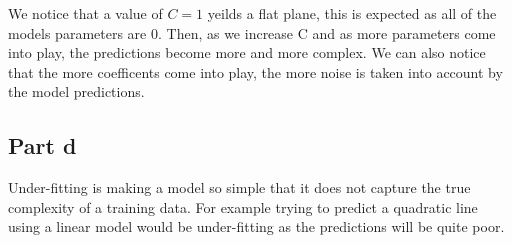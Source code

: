 \documentclass[10pt]{article}
\begin{document}
\begin{figure}[H]
\end{figure}

We notice that a value of $C = 1$ yeilds a flat plane, this is expected as all of the
models parameters are 0. Then, as we increase C and as more parameters come into play,
the predictions become more and more complex. We can also notice that the more
coefficents come into play, the more noise is taken into account by the model
predictions.


\subsection*{Part d}
Under-fitting is making a model so simple that it does not capture the
true complexity of a training data. For example trying to predict a
quadratic line using a linear model would be under-fitting as the predictions will
be quite poor.
\end{document}
